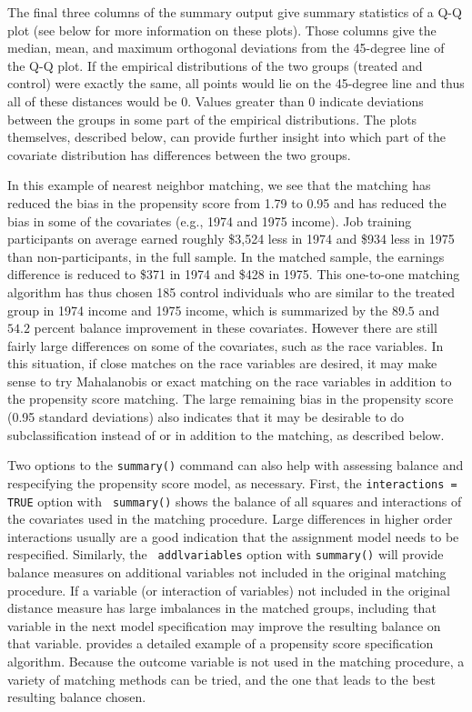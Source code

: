 \documentclass[oneside,letterpaper,titlepage]{article}
\begin{document}
\begin{enumerate}
The final three columns of the summary output give summary statistics
of a Q-Q plot (see below for more information on these plots). Those
columns give the median, mean, and maximum orthogonal deviations from
the 45-degree line of the Q-Q plot.  If the empirical distributions of
the two groups (treated and control) were exactly the same, all points
would lie on the 45-degree line and thus all of these distances would
be 0.  Values greater than 0 indicate deviations between the groups in
some part of the empirical distributions.  The plots themselves,
described below, can provide further insight into which part of the
covariate distribution has differences between the two groups.

In this example of nearest neighbor matching, we see that the matching
has reduced the bias in the propensity score from 1.79 to 0.95 and has
reduced the bias in some of the covariates (e.g., 1974 and 1975
income).  Job training participants on average earned roughly \$3,524
less in 1974 and \$934 less in 1975 than non-participants, in the full
sample.  In the matched sample, the earnings difference is reduced to
\$371 in 1974 and \$428 in 1975.  This one-to-one matching algorithm
has thus chosen 185 control individuals who are similar to the treated
group in 1974 income and 1975 income, which is summarized by the
$89.5$ and $54.2$ percent balance improvement in these covariates.
However there are still fairly large differences on some of the
covariates, such as the race variables.  In this situation, if close
matches on the race variables are desired, it may make sense to try
Mahalanobis or exact matching on the race variables in addition to the
propensity score matching.  The large remaining bias in the propensity
score (0.95 standard deviations) also indicates that it may be
desirable to do subclassification instead of or in addition to the
matching, as described below.

Two options to the \texttt{summary()} command can also help with
assessing balance and respecifying the propensity score model, as
necessary.  First, the {\tt interactions = TRUE} option with {\tt
  summary()} shows the balance of all squares and interactions of the
covariates used in the matching procedure.  Large differences in
higher order interactions usually are a good indication that the
assignment model needs to be respecified.  Similarly, the {\tt
  addlvariables} option with {\tt summary()} will provide balance
measures on additional variables not included in the original matching
procedure.  If a variable (or interaction of variables) not included
in the original distance measure has large imbalances in the matched
groups, including that variable in the next model specification may
improve the resulting balance on that variable.  \cite{DehWah99}
provides a detailed example of a propensity score specification
algorithm.  Because the outcome variable is not used in the matching
procedure, a variety of matching methods can be tried, and the one
that leads to the best resulting balance chosen.


\end{enumerate}
\end{document}
